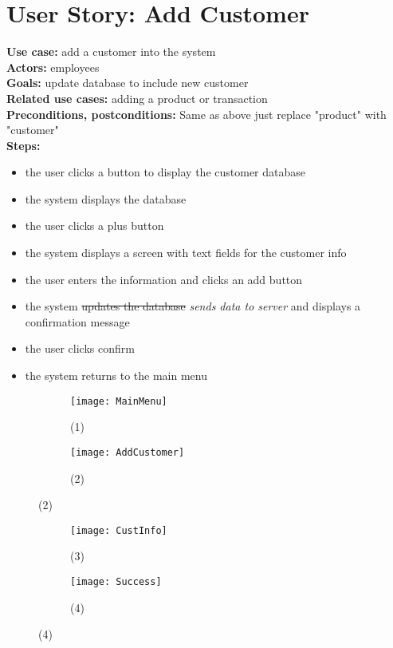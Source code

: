 \documentclass[notitlepage,11pt]{article}
\begin{document}
\section{User Story: Add Customer}
	\textbf{Use case:} add a customer into the system\\
	\textbf{Actors:} employees\\
	\textbf{Goals:} update database to include new customer\\
	\textbf{Related use cases:} adding a product or transaction\\
	\textbf{Preconditions, postconditions:} Same as above just replace "product" with "customer"\\
		\textbf{Steps:}
		\begin{itemize}
		\item[(1)] the user clicks a button to display the customer database
		\item[(2)] the system displays the database
		\item the user clicks a plus button 
		\item[(3)] the system displays a screen with text fields for the customer info
		\item the user enters the information and clicks an add button
		\item[(4)] the system \sout{updates the database} \emph{sends data to server} and displays a confirmation message
		\item the user clicks confirm 
		\item[(1)] the system returns to the main menu
		\end{itemize}
\begin{figure}[h]
	\begin{subfigure}{.5\textwidth}
	\centering
	\texttt{[image: MainMenu]}
	\caption{(1)}
	\end{subfigure}%
	\begin{subfigure}{.5\textwidth}
	\centering
	\texttt{[image: AddCustomer]}
	\caption{(2)}
	\end{subfigure}
\end{figure}
\begin{figure}[h]
	\begin{subfigure}{.5\textwidth}
	\centering
	\texttt{[image: CustInfo]}
	\caption{(3)}
	\end{subfigure}%
	\begin{subfigure}{.5\textwidth}
	\centering
	\texttt{[image: Success]}
	\caption{(4)}
	\end{subfigure}
\end{figure}
\end{document}
